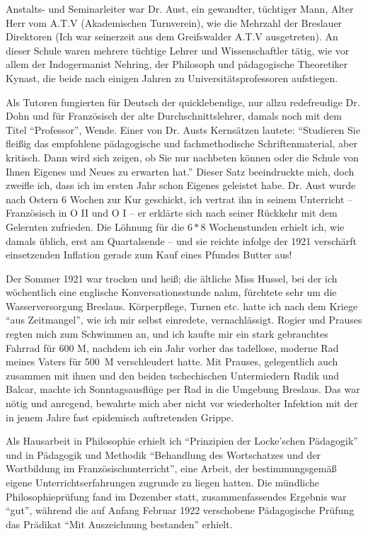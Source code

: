 \documentclass[a5paper,pagesize,10pt,twoside=true]{scrbook}
\begin{document}
Anstalts- und Seminarleiter war Dr. Aust, ein gewandter, tüchtiger Mann, Alter Herr vom A.T.V (Akademischen Turnverein), wie die Mehrzahl der Breslauer Direktoren (Ich war seinerzeit aus dem Greifswalder A.T.V ausgetreten). An dieser Schule waren mehrere tüchtige Lehrer und Wissenschaftler tätig, wie vor allem der Indogermanist Nehring, der Philosoph und pädagogische Theoretiker Kynast, die beide nach einigen Jahren zu Universitätsprofessoren aufstiegen.

Als Tutoren fungierten für Deutsch der quicklebendige, nur allzu redefreudige Dr. Dohn und für Französisch der alte Durchschnittslehrer, damals noch mit dem Titel \enquote{Professor}, Wende. Einer von Dr. Austs Kernsätzen lautete: \enquote{Studieren Sie fleißig das empfohlene pädagogische und fachmethodische Schriftenmaterial, aber kritisch. Dann wird sich zeigen, ob Sie nur nachbeten können oder die Schule von Ihnen Eigenes und Neues zu erwarten hat.} Dieser Satz beeindruckte mich, doch zweifle ich, dass ich im ersten Jahr schon Eigenes geleistet habe. Dr. Aust wurde nach Ostern 6 Wochen zur Kur geschickt, ich vertrat ihn in seinem Unterricht -- Französisch in O II und O I -- er erklärte sich nach seiner Rückkehr mit dem Gelernten zufrieden. Die Löhnung für die $6 * 8$ Wochenstunden erhielt ich, wie damals üblich, erst am Quartalsende -- und sie reichte infolge der 1921 verschärft einsetzenden Inflation gerade zum Kauf eines Pfundes Butter aus!

Der Sommer 1921 war trocken und heiß; die ältliche Miss Hussel, bei der ich wöchentlich eine englische Konversationsstunde nahm, fürchtete sehr um die Wasserversorgung Breslaus. Körperpflege, Turnen etc. hatte ich nach dem Kriege \enquote{aus Zeitmangel}, wie ich mir selbst einredete, vernachlässigt. Rogier und Prauses regten mich zum Schwimmen an, und ich kaufte mir ein stark gebrauchtes Fahrrad für 600 M, nachdem ich ein Jahr vorher das tadellose, moderne Rad meines Vaters für 500~M verschleudert hatte. Mit Prauses, gelegentlich auch zusammen mit ihnen und den beiden tschechischen Untermiedern Rudik und Balcar, machte ich Sonntagsausflüge per Rad in die Umgebung Breslaus. Das war nötig und anregend, bewahrte mich aber nicht vor wiederholter Infektion mit der in jenem Jahre fast epidemisch auftretenden Grippe.

Als Hausarbeit in Philosophie erhielt ich \enquote{Prinzipien der Locke'schen Pädagogik} und in Pädagogik und Methodik \enquote{Behandlung des Wortschatzes und der Wortbildung im Französischunterricht}, eine Arbeit, der bestimmungsgemäß eigene Unterrichtserfahrungen zugrunde zu liegen hatten. Die mündliche Philosophieprüfung fand im Dezember statt, zusammenfassendes Ergebnis war \enquote{gut}, während die auf Anfang Februar 1922 verschobene Pädagogische Prüfung das Prädikat \enquote{Mit Auszeichnung bestanden} erhielt.
\end{document}
